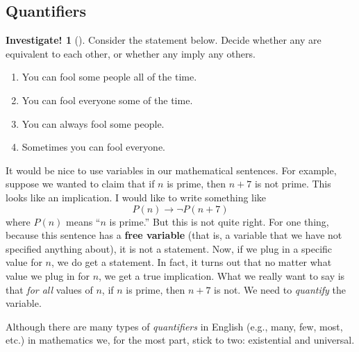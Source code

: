 \documentclass[10pt,]{book}
\newcommand{\terminology}[1]{\textbf{#1}}
\theoremstyle{plain}
\theoremstyle{definition}
\theoremstyle{definition}
\theoremstyle{definition}
\newtheorem{investigation}[project]{Investigate!}
\theoremstyle{definition}
\numberwithin{equation}{chapter}
\def\imp{\rightarrow}
\begin{document}
\subsection[{Quantifiers}]{Quantifiers}\label{subsec_quantifiers}
\begin{investigation}[]\label{investigation-11}
\hypertarget{p-1456}{}%
Consider the statement below. Decide whether any are equivalent to each other, or whether any imply any others.%
\par
\hypertarget{p-1457}{}%
%
\begin{enumerate}
\item\hypertarget{li-319}{}\hypertarget{p-1458}{}%
You can fool some people all of the time.%
\item\hypertarget{li-320}{}\hypertarget{p-1459}{}%
You can fool everyone some of the time.%
\item\hypertarget{li-321}{}\hypertarget{p-1460}{}%
You can always fool some people.%
\item\hypertarget{li-322}{}\hypertarget{p-1461}{}%
Sometimes you can fool everyone.%
\end{enumerate}
%
\end{investigation}
\hypertarget{p-1462}{}%
It would be nice to use variables in our mathematical sentences. For example, suppose we wanted to claim that if \(n\) is prime, then \(n+7\) is not prime. This looks like an implication. I would like to write something like%
\begin{equation*}
P(n) \imp \neg P(n+7) 
\end{equation*}
where \(P(n)\) means ``\(n\) is prime.'' But this is not quite right. For one thing, because this sentence has a \terminology{free variable} (that is, a variable that we have not specified anything about), it is not a statement. Now, if we plug in a specific value for \(n\), we do get a statement. In fact, it turns out that no matter what value we plug in for \(n\), we get a true implication. What we really want to say is that \emph{for all} values of \(n\), if \(n\) is prime, then \(n+7\) is not. We need to \emph{quantify} the variable.%
\par
\hypertarget{p-1463}{}%
Although there are many types of \emph{quantifiers} in English (e.g., many, few, most, etc.) in mathematics we, for the most part, stick to two: existential and universal.%
\end{document}
